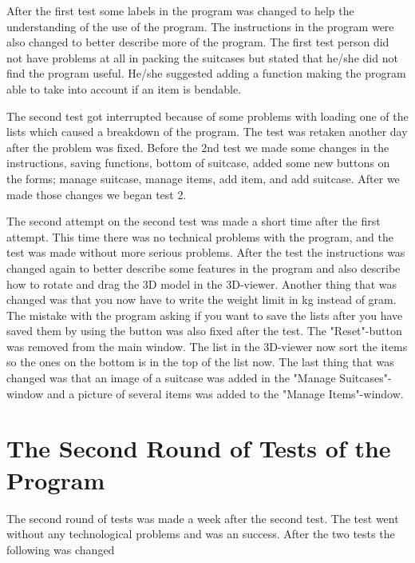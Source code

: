 After the first test some labels in the program was changed to help the understanding of the use of the program. The instructions in the program were also changed to better describe more of the program. The first test person did not have problems at all in packing the suitcases but stated that he/she did not find the program useful. He/she suggested adding a function making the program able to take into account if an item is bendable.

The second test got interrupted because of some problems with loading one of the lists which caused a breakdown of the program. The test was retaken another day after the problem was fixed. Before the 2nd test we made some changes in the instructions, saving functions, bottom of suitcase, added some new buttons on the forms; manage suitcase, manage items, add item, and add suitcase. After we made those changes we began test 2.

The second attempt on the second test was made a short time after the first attempt. This time there was no technical problems with the program, and the test was made without more serious problems. After the test the instructions was changed again to better describe some features in the program and also describe how to rotate and drag the 3D model in the 3D-viewer. Another thing that was changed was that you now have to write the weight limit in kg instead of gram. The mistake with the program asking if you want to save the lists after you have saved them by using the button was also fixed after the test. The "Reset"-button  was removed from the main window. The list in the 3D-viewer now sort the items so the ones on the bottom is in the top of the list now. The last thing that was changed was that an image of a suitcase was added in the "Manage Suitcases"-window and a picture of several items was added to the "Manage Items"-window.

\section{The Second Round of Tests of the Program}

The second round of tests was made a week after the second test. The test went without any technological problems and was an success. After the two tests the following was changed 